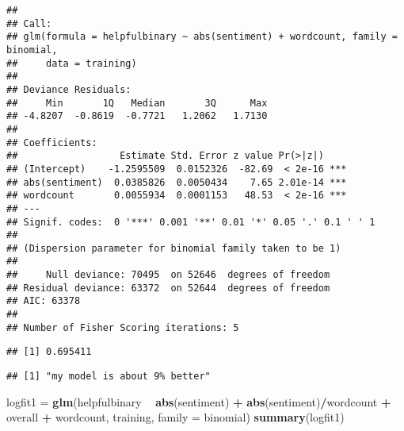 \documentclass[
]{article}
\newenvironment{Shaded}{\begin{snugshade}}{\end{snugshade}}
\newcommand{\DataTypeTok}[1]{\textcolor[rgb]{0.13,0.29,0.53}{#1}}
\newcommand{\FloatTok}[1]{\textcolor[rgb]{0.00,0.00,0.81}{#1}}
\newcommand{\KeywordTok}[1]{\textcolor[rgb]{0.13,0.29,0.53}{\textbf{#1}}}
\newcommand{\NormalTok}[1]{#1}
\newcommand{\OperatorTok}[1]{\textcolor[rgb]{0.81,0.36,0.00}{\textbf{#1}}}
\newcommand{\StringTok}[1]{\textcolor[rgb]{0.31,0.60,0.02}{#1}}
\begin{document}
\begin{verbatim}
## 
## Call:
## glm(formula = helpfulbinary ~ abs(sentiment) + wordcount, family = binomial, 
##     data = training)
## 
## Deviance Residuals: 
##     Min       1Q   Median       3Q      Max  
## -4.8207  -0.8619  -0.7721   1.2062   1.7130  
## 
## Coefficients:
##                  Estimate Std. Error z value Pr(>|z|)    
## (Intercept)    -1.2595509  0.0152326  -82.69  < 2e-16 ***
## abs(sentiment)  0.0385826  0.0050434    7.65 2.01e-14 ***
## wordcount       0.0055934  0.0001153   48.53  < 2e-16 ***
## ---
## Signif. codes:  0 '***' 0.001 '**' 0.01 '*' 0.05 '.' 0.1 ' ' 1
## 
## (Dispersion parameter for binomial family taken to be 1)
## 
##     Null deviance: 70495  on 52646  degrees of freedom
## Residual deviance: 63372  on 52644  degrees of freedom
## AIC: 63378
## 
## Number of Fisher Scoring iterations: 5
\end{verbatim}

\begin{Shaded}
\end{Shaded}

\begin{verbatim}
## [1] 0.695411
\end{verbatim}

\begin{Shaded}
\end{Shaded}

\begin{verbatim}
## [1] "my model is about 9% better"
\end{verbatim}

\begin{Shaded}
\begin{Highlighting}[]
\NormalTok{logfit1 =}\StringTok{ }\KeywordTok{glm}\NormalTok{(helpfulbinary }\OperatorTok{~}\StringTok{ }\KeywordTok{abs}\NormalTok{(sentiment) }\OperatorTok{+}\StringTok{ }\KeywordTok{abs}\NormalTok{(sentiment)}\OperatorTok{/}\NormalTok{wordcount }\OperatorTok{+}\StringTok{ }\NormalTok{overall }\OperatorTok{+}\StringTok{ }\NormalTok{wordcount, training, }\DataTypeTok{family =}\NormalTok{ binomial)}
\KeywordTok{summary}\NormalTok{(logfit1)}
\end{Highlighting}
\end{Shaded}
\end{document}
